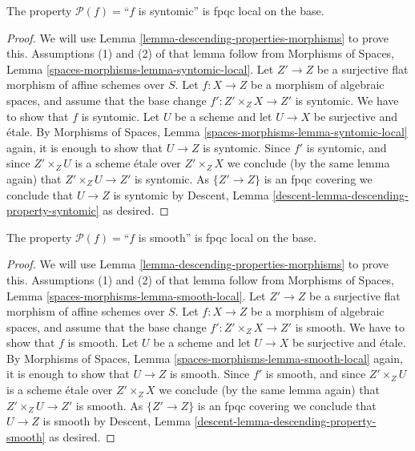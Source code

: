 \begin{lemma}
\label{lemma-descending-property-syntomic}
The property $\mathcal{P}(f) =$``$f$ is syntomic''
is fpqc local on the base.
\end{lemma}

\begin{proof}
We will use
Lemma \ref{lemma-descending-properties-morphisms}
to prove this. Assumptions (1) and (2) of that lemma follow from
Morphisms of Spaces,
Lemma \ref{spaces-morphisms-lemma-syntomic-local}.
Let $Z' \to Z$ be a surjective flat morphism of affine schemes over $S$.
Let $f : X \to Z$ be a morphism of algebraic spaces, and assume
that the base change $f' : Z' \times_Z X \to Z'$ is syntomic.
We have to show that $f$ is syntomic. Let $U$ be a scheme
and let $U \to X$ be surjective and \'etale. By
Morphisms of Spaces,
Lemma \ref{spaces-morphisms-lemma-syntomic-local}
again, it is enough to show that $U \to Z$ is syntomic.
Since $f'$ is syntomic, and since $Z' \times_Z U$ is a
scheme \'etale over $Z' \times_Z X$ we conclude (by the same lemma again) that
$Z' \times_Z U \to Z'$ is syntomic.
As $\{Z' \to Z\}$ is an fpqc covering we conclude that
$U \to Z$ is syntomic by
Descent, Lemma \ref{descent-lemma-descending-property-syntomic}
as desired.
\end{proof}

\begin{lemma}
\label{lemma-descending-property-smooth}
The property $\mathcal{P}(f) =$``$f$ is smooth''
is fpqc local on the base.
\end{lemma}

\begin{proof}
We will use
Lemma \ref{lemma-descending-properties-morphisms}
to prove this. Assumptions (1) and (2) of that lemma follow from
Morphisms of Spaces,
Lemma \ref{spaces-morphisms-lemma-smooth-local}.
Let $Z' \to Z$ be a surjective flat morphism of affine schemes over $S$.
Let $f : X \to Z$ be a morphism of algebraic spaces, and assume
that the base change $f' : Z' \times_Z X \to Z'$ is smooth.
We have to show that $f$ is smooth. Let $U$ be a scheme
and let $U \to X$ be surjective and \'etale. By
Morphisms of Spaces,
Lemma \ref{spaces-morphisms-lemma-smooth-local}
again, it is enough to show that $U \to Z$ is smooth.
Since $f'$ is smooth, and since $Z' \times_Z U$ is a
scheme \'etale over $Z' \times_Z X$ we conclude (by the same lemma again) that
$Z' \times_Z U \to Z'$ is smooth.
As $\{Z' \to Z\}$ is an fpqc covering we conclude that
$U \to Z$ is smooth by
Descent, Lemma \ref{descent-lemma-descending-property-smooth}
as desired.
\end{proof}

